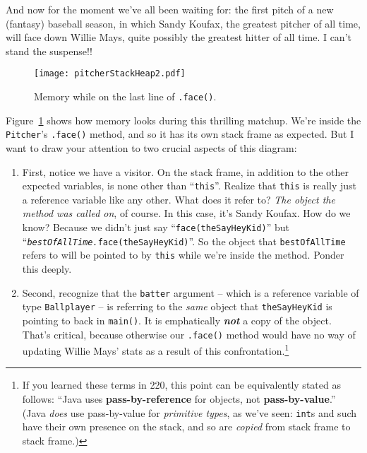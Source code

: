 And now for the moment we've all been waiting for: the first pitch of a new
(fantasy) baseball season, in which Sandy Koufax, the greatest pitcher of all
time, will face down Willie Mays, quite possibly the greatest hitter of all
time. I can't stand the suspense!!

\begin{figure}
\centering
\texttt{[image: pitcherStackHeap2.pdf]}  %
\caption{Memory while on the last line of \texttt{.face()}.}
\label{fig:pitcherStackHeap2}
\end{figure}

Figure~\ref{fig:pitcherStackHeap2} shows how memory looks during this
thrilling matchup. We're inside the \texttt{Pitcher}'s \texttt{.face()}
method, and so it has its own stack frame as expected. But I want to draw your
attention to two crucial aspects of this diagram:

\begin{enumerate}
\itemsep.1em
\item First, notice we have a visitor. On the stack frame, in addition to the
other expected variables, is none other than ``\texttt{this}''. Realize that
\texttt{this} is really just a reference variable like any other. What does it
refer to? \textit{The object the method was called on}, of course. In this
case, it's Sandy Koufax. How do we know? Because we didn't
just say ``\texttt{face(theSayHeyKid)}'' but
``\texttt{\textit{bestOfAllTime.}face(theSayHeyKid)}''. So the object that
\texttt{bestOfAllTime} refers to will be pointed to by \texttt{this} while
we're inside the method. Ponder this deeply.

\item Second, recognize that the \texttt{batter} argument -- which is a
reference variable of type \texttt{Ballplayer} -- is referring to the
\textit{same} object that \texttt{theSayHeyKid} is pointing to back in
\texttt{main()}. It is emphatically \textbf{\textit{not}} a copy of the
object. That's critical, because otherwise our \texttt{.face()} method would
have no way of updating Willie Mays' stats as a result of this
confrontation.\footnote{If you learned these terms in 220, this point can be
equivalently stated as follows: ``Java uses \textbf{pass-by-reference} for
objects, not \textbf{pass-by-value}.'' (Java \textit{does} use pass-by-value
for \textit{primitive types}, as we've seen: \texttt{int}s and such have their
own presence on the stack, and so are \textit{copied} from stack frame to
stack frame.)}

\end{enumerate}

